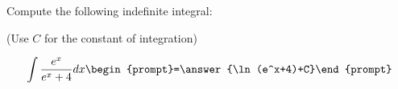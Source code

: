 \documentclass{ximera}
\author{Jim Talamo}
\begin{document}
\begin{exercise}
Compute the following indefinite integral:

\begin{prompt} (Use $C$ for the constant of integration) \end{prompt}

\[
\int \frac{e^x}{e^x+4} dx 
\begin{prompt}=\answer{\ln(e^x+4)+C}\end{prompt}
\]
\end{exercise}
\end{document}
